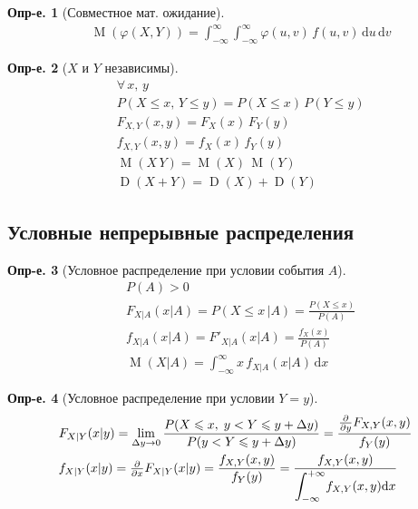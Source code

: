 \documentclass[a4paper,12pt,fleqn]{article}
\numberwithin{figure}{section}
\theoremstyle{definition}
\newtheorem{definition}{Опр-е.}[section]
\let\phi\varphi
\let\leqs\leqslant
\def\d{\mathrm{d}}
\DeclareMathOperator{\M}{M}
\DeclareMathOperator{\D}{D}
\begin{document}
\begin{definition}[Совместное мат. ожидание]
\begin{align*}
&	\M \left(\phi(X,Y) \right)
	= \int_{-\infty}^{\infty} \int_{-\infty}^{\infty}
			\phi(u,v) \, f(u,v) \, \d u \, \d v
\end{align*}
\end{definition}

\begin{definition}[$X$ и $Y$ независимы]
\begin{align*}
&	\forall \, x, \, y	\\
&	P(X \leqs x, \, Y \leqs y) = P(X \leqs x) \, P(Y \leqs y)	\\
&	F_{X,Y}(x,y) = F_X(x) \, F_Y(y)		\\
&	f_{X,Y}(x,y) = f_X(x) \, f_Y(y)		\\
&	\M(X\,Y) = \M(X)\,\M(Y)		\\
&	\D(X+Y) = \D(X) + \D(Y)
\end{align*}
\end{definition}


\subsection{Условные непрерывные распределения}

\begin{definition}[Условное распределение при условии события $A$]
\begin{align*}
&	P(A)>0	\\
&	F_{X|A}(x|A) = P(X \leqs x \,| A) = \frac{P(X \leqs x)}{P(A)}	\\
&	f_{X|A}(x|A) = F'_{X|A}(x|A) = \frac{f_X(x)}{P(A)}	\\
&	\M(X|A) = \int_{-\infty}^{\infty} x \, f_{X|A}(x|A) \, \d x
\end{align*}
\end{definition}

\begin{definition}[Условное распределение при условии $Y=y$]
\begin{align*}
&	F_{X|Y}(x|y)
	= \lim_{\Delta y\to 0} \frac{P(X\leqs x ,\; y<Y\leqs y+\Delta y)}
								{P(y< Y\leqs y+\Delta y)}
	= \frac{\frac{\partial}{\partial y}F_{X,Y}(x,y)}{f_Y(y)}	\\
&	f_{X|Y}(x|y)
	= \mathsmaller{\frac{\partial}{\partial x}} F_{X|Y}(x|y)
	= \frac{f_{X,Y}(x,y)}{f_Y(y)}
	= \frac{f_{X,Y}(x,y)}
		   {\mathlarger\int_{-\infty}^{+\infty} f_{X,Y}(x,y)\d x}	\\
\end{align*}
\end{definition}
\end{document}
